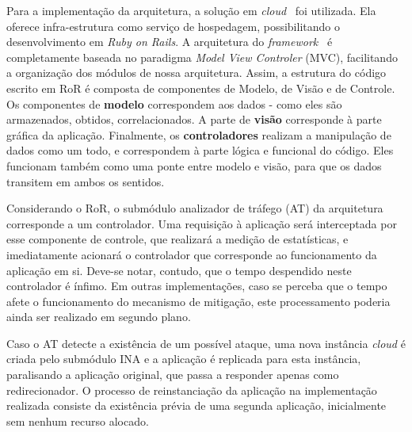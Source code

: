 Para a implementação da arquitetura, a solução em \emph{cloud}~\cite{heroku} foi utilizada. Ela oferece infra-estrutura como serviço de hospedagem, possibilitando o desenvolvimento em \emph{Ruby on Rails}. %
%
%
A arquitetura do \emph{framework}~\cite{ror} é completamente baseada no paradigma \emph{Model View Controler} (MVC), facilitando a organização dos módulos de nossa arquitetura. Assim, a estrutura do código escrito em RoR é composta de componentes de Modelo, de Visão e de Controle. Os componentes de \textbf{modelo} correspondem aos dados - como eles são armazenados, obtidos, correlacionados. A parte de \textbf{visão} corresponde à parte gráfica da aplicação. Finalmente, os \textbf{controladores} realizam a manipulação de dados como um todo, e correspondem à parte lógica e funcional do código. Eles funcionam também como uma ponte entre modelo e visão, para que os dados transitem em ambos os sentidos.
%

Considerando o RoR, o submódulo analizador de tráfego (AT) da arquitetura corresponde a um controlador. Uma requisição à aplicação será interceptada por esse componente de controle, que realizará a medição de estatísticas, e imediatamente acionará o controlador que corresponde ao funcionamento da aplicação em si. Deve-se notar, contudo, que o tempo despendido neste controlador é ínfimo. Em outras implementações, caso se perceba que o tempo afete o funcionamento do mecanismo de mitigação, este processamento poderia ainda ser realizado em segundo plano.

Caso o AT detecte a existência de um possível ataque, uma nova instância \emph{cloud} é criada pelo submódulo INA e a aplicação é replicada para esta instância, paralisando a aplicação original, que passa a responder apenas como redirecionador. O processo de reinstanciação da aplicação na implementação realizada consiste da existência prévia de uma segunda aplicação, inicialmente sem nenhum recurso alocado. %

